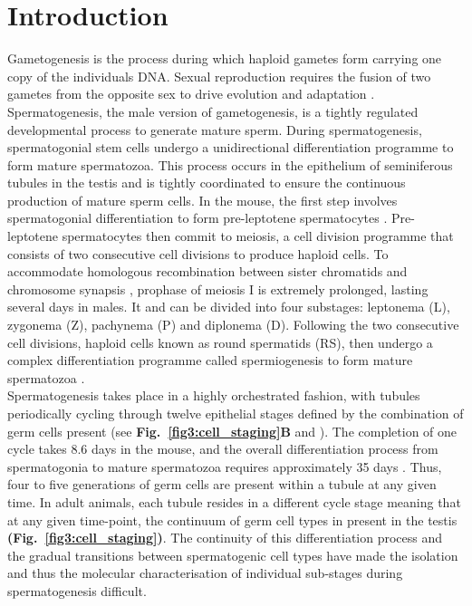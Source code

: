 
\section{Introduction}

Gametogenesis is the process during which haploid gametes form carrying one copy of the individuals DNA. Sexual reproduction requires the fusion of two gametes from the opposite sex to drive evolution and adaptation \citep{McDonald2016}. Spermatogenesis, the male version of gametogenesis, is a tightly regulated developmental process to generate mature sperm. 
During spermatogenesis, spermatogonial stem cells undergo a unidirectional differentiation programme to form mature spermatozoa. This process occurs in the epithelium of seminiferous tubules in the testis and is tightly coordinated to ensure the continuous production of mature sperm cells. In the mouse, the first step involves spermatogonial differentiation to form pre-leptotene spermatocytes \citep{Oakberg1971, DeRooij1973, DeRooij2000}. Pre-leptotene spermatocytes then commit to meiosis, a cell division programme that consists of two consecutive cell divisions to produce haploid cells. To accommodate homologous recombination between sister chromatids and chromosome synapsis \citep{Marston2004}, prophase of meiosis I is extremely prolonged, lasting several days in males. It and can be divided into four substages: leptonema (L), zygonema (Z), pachynema (P) and diplonema (D). Following the two consecutive cell divisions, haploid cells known as round spermatids (RS), then undergo a complex differentiation programme called spermiogenesis to form mature spermatozoa \citep{Oakberg1956}. \\

Spermatogenesis takes place in a highly orchestrated fashion, with tubules periodically cycling through twelve epithelial stages defined by the combination of germ cells present (see \textbf{Fig.~\ref{fig3:cell_staging}B} and \citep{Oakberg1956}). The completion of one cycle takes 8.6 days in the mouse, and the overall differentiation process from spermatogonia to mature spermatozoa requires approximately 35 days \citep{Oakberg1956a}. Thus, four to five generations of germ cells are present within a tubule at any given time. In adult animals, each tubule resides in a different cycle stage meaning that at any given time-point, the continuum of germ cell types in present in the testis \textbf{(Fig.~\ref{fig3:cell_staging})}. The continuity of this differentiation process and the gradual transitions between spermatogenic cell types have made the isolation and thus the molecular characterisation of individual sub-stages during spermatogenesis difficult.

